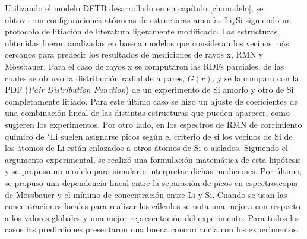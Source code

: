 Utilizando el modelo DFTB desarrollado en en capítulo \ref{ch:modelo}, se 
obtuvieron configuraciones atómicas de estructuras amorfas Li$_x$Si siguiendo un 
protocolo de litiación de literatura ligeramente modificado. Las estructuras 
obtenidas fueron analizadas en base a modelos que consideran los vecinos más 
cercanos para predecir los resultados de mediciones de rayos x, RMN y Mössbauer.
Para el caso de rayos x se computaron las RDFs parciales, de las cuales se obtuvo
la distribución radial de a pares, $G(r)$, y se la comparó con la PDF 
(\textit{Pair Distribution Function}) de un experimento de Si amorfo y otro de Si
completamente litiado. Para este último caso se hizo un ajuste de coeficientes de 
una combinación lineal de las distintas estructuras que pueden aparecer, como 
sugieren los experimentos. Por otro lado, en los espectros de RMN de corrimiento 
químico de $^7$Li suelen asignarse picos según el criterio de si los vecinos de Si de los átomos de Li están
enlazados a otros átomos de Si o aislados. Siguiendo el argumento experimental, se realizó una 
formulación matemática de esta hipótesis y se propuso un modelo para simular e 
interpretar dichas mediciones. Por último, se propuso una dependencia lineal 
entre la separación de picos en espectroscopia de Mössbauer y el mínimo de 
concentración entre Li y Si. Cuando se usan las concentraciones locales para 
realizar los cálculos se nota una mejora con respecto a los valores globales y
una mejor representación del experimento. Para todos los casos las predicciones
presentaron una buena concordancia con los experimentos.

\section{}



